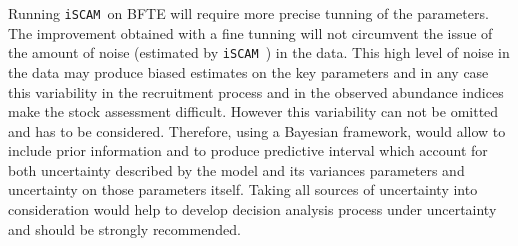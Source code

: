 \documentclass[ 12pt]{article}\usepackage{graphicx, color}
\newcommand{\iscam}{\texttt{iSCAM }}
\begin{document}
Running \iscam on BFTE will require more precise tunning of the parameters. The improvement obtained with a fine tunning will not circumvent the issue of the amount of noise (estimated by \iscam ) in the data. This high level of noise in the data may produce biased estimates on the key parameters and in any case this variability in the recruitment process and in the observed abundance indices make the stock assessment difficult. However this variability can not be omitted and has to be considered. Therefore, using a Bayesian framework, would allow to include prior information and to produce predictive interval which account for both uncertainty described by the model and its variances parameters and  uncertainty on those parameters itself.  Taking all sources of uncertainty into consideration would help to develop decision analysis process under uncertainty and should be strongly recommended.


%


\end{document}
